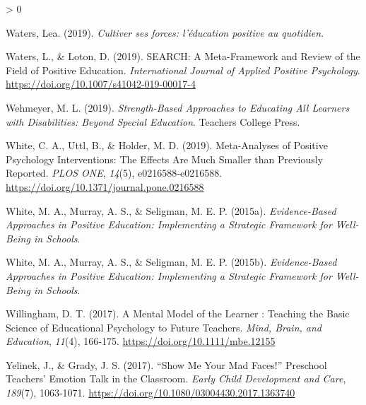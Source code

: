 \documentclass[
  french,
]{article}
\newlength{\cslhangindent}
\newenvironment{CSLReferences}[2] %
 {%
  \setlength{\parindent}{0pt}
  \ifodd #1 \everypar{\setlength{\hangindent}{\cslhangindent}}\ignorespaces\fi
  \ifnum #2 > 0
  \setlength{\parskip}{#2\baselineskip}
  \fi
 }%
 {}
\begin{document}
\begin{CSLReferences}{1}{0}
\leavevmode\hypertarget{ref-waters2019}{}%
Waters, Lea. (2019). \emph{{Cultiver ses forces: l'éducation positive au quotidien}}.

\leavevmode\hypertarget{ref-waters2019a}{}%
Waters, L., \& Loton, D. (2019). {SEARCH}: {A Meta}-{Framework} and {Review} of the {Field} of {Positive Education}. \emph{International Journal of Applied Positive Psychology}. \url{https://doi.org/10.1007/s41042-019-00017-4}

\leavevmode\hypertarget{ref-wehmeyer2019a}{}%
Wehmeyer, M. L. (2019). \emph{Strength-Based Approaches to Educating All Learners with Disabilities: Beyond Special Education}. {Teachers College Press}.

\leavevmode\hypertarget{ref-white2019}{}%
White, C. A., Uttl, B., \& Holder, M. D. (2019). Meta-Analyses of Positive Psychology Interventions: {The} Effects Are Much Smaller than Previously Reported. \emph{PLOS ONE}, \emph{14}(5), e0216588‑e0216588. \url{https://doi.org/10.1371/journal.pone.0216588}

\leavevmode\hypertarget{ref-white2015a}{}%
White, M. A., Murray, A. S., \& Seligman, M. E. P. (2015a). \emph{Evidence-Based Approaches in Positive Education: Implementing a Strategic Framework for Well-Being in Schools}.

\leavevmode\hypertarget{ref-white2015c}{}%
White, M. A., Murray, A. S., \& Seligman, M. E. P. (2015b). \emph{Evidence-Based Approaches in Positive Education: Implementing a Strategic Framework for Well-Being in Schools}.

\leavevmode\hypertarget{ref-willingham2017}{}%
Willingham, D. T. (2017). A {Mental Model} of the {Learner} : {Teaching} the {Basic Science} of {Educational Psychology} to {Future Teachers}. \emph{Mind, Brain, and Education}, \emph{11}(4), 166‑175. \url{https://doi.org/10.1111/mbe.12155}

\leavevmode\hypertarget{ref-yelinek2017}{}%
Yelinek, J., \& Grady, J. S. (2017). {``{Show} Me Your Mad Faces!''} Preschool Teachers' Emotion Talk in the Classroom. \emph{Early Child Development and Care}, \emph{189}(7), 1063‑1071. \url{https://doi.org/10.1080/03004430.2017.1363740}

\end{CSLReferences}
\end{document}
